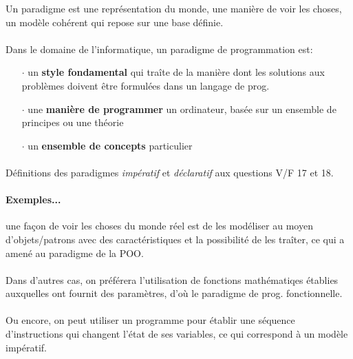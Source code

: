 \item{}
{Un paradigme est une représentation du monde, une manière de voir les choses, un modèle cohérent qui repose sur une base définie.
\paragraph{} \setlength{\itemsep}{.3em}
Dans le domaine de l'informatique, un paradigme de programmation est:
\begin{itemize}
\item[$\cdot$]un \textbf{style fondamental} qui traîte de la manière dont les solutions aux problèmes doivent être formulées dans un langage de prog.
\item[$\cdot$]une \textbf{manière de programmer} un ordinateur, basée sur un ensemble de principes ou une théorie
\item[$\cdot$]un \textbf{ensemble de concepts} particulier
\end{itemize}

\paragraph{}
Définitions des paradigmes \textit{impératif} et \textit{déclaratif} aux questions V/F 17 et 18.


\paragraph{Exemples...} une façon de voir les choses du monde réel est de les modéliser au moyen d'objets/patrons avec des caractéristiques et la possibilité de les traîter, ce qui a amené au paradigme de la POO. \paragraph{}Dans d'autres cas, on préférera l'utilisation de fonctions mathématiqes établies auxquelles ont fournit des paramètres, d'où le paradigme de prog. fonctionnelle.\paragraph{}Ou encore, on peut utiliser un programme pour établir une séquence d'instructions qui changent l'état de ses variables, ce qui correspond à un modèle impératif.
}


